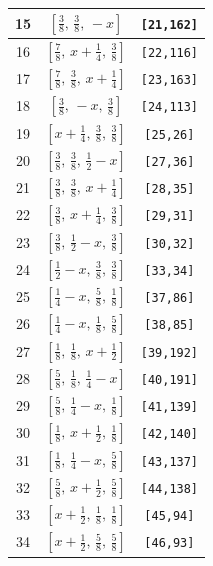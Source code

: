 \documentclass[fleqn,8pt]{jsarticle}
\begin{document}
\begin{longtable}{ccc}
15 & $\left[ \frac{3}{8},\, \frac{3}{8},\, - x \right]$ & {\tt [21,162]} \\ \hline
16 & $\left[ \frac{7}{8},\, x + \frac{1}{4},\, \frac{3}{8} \right]$ & {\tt [22,116]} \\ \hline
17 & $\left[ \frac{7}{8},\, \frac{3}{8},\, x + \frac{1}{4} \right]$ & {\tt [23,163]} \\ \hline
18 & $\left[ \frac{3}{8},\, - x,\, \frac{3}{8} \right]$ & {\tt [24,113]} \\ \hline
19 & $\left[ x + \frac{1}{4},\, \frac{3}{8},\, \frac{3}{8} \right]$ & {\tt [25,26]} \\ \hline
20 & $\left[ \frac{3}{8},\, \frac{3}{8},\, \frac{1}{2} - x \right]$ & {\tt [27,36]} \\ \hline
21 & $\left[ \frac{3}{8},\, \frac{3}{8},\, x + \frac{1}{4} \right]$ & {\tt [28,35]} \\ \hline
22 & $\left[ \frac{3}{8},\, x + \frac{1}{4},\, \frac{3}{8} \right]$ & {\tt [29,31]} \\ \hline
23 & $\left[ \frac{3}{8},\, \frac{1}{2} - x,\, \frac{3}{8} \right]$ & {\tt [30,32]} \\ \hline
24 & $\left[ \frac{1}{2} - x,\, \frac{3}{8},\, \frac{3}{8} \right]$ & {\tt [33,34]} \\ \hline
25 & $\left[ \frac{1}{4} - x,\, \frac{5}{8},\, \frac{1}{8} \right]$ & {\tt [37,86]} \\ \hline
26 & $\left[ \frac{1}{4} - x,\, \frac{1}{8},\, \frac{5}{8} \right]$ & {\tt [38,85]} \\ \hline
27 & $\left[ \frac{1}{8},\, \frac{1}{8},\, x + \frac{1}{2} \right]$ & {\tt [39,192]} \\ \hline
28 & $\left[ \frac{5}{8},\, \frac{1}{8},\, \frac{1}{4} - x \right]$ & {\tt [40,191]} \\ \hline
29 & $\left[ \frac{5}{8},\, \frac{1}{4} - x,\, \frac{1}{8} \right]$ & {\tt [41,139]} \\ \hline
30 & $\left[ \frac{1}{8},\, x + \frac{1}{2},\, \frac{1}{8} \right]$ & {\tt [42,140]} \\ \hline
31 & $\left[ \frac{1}{8},\, \frac{1}{4} - x,\, \frac{5}{8} \right]$ & {\tt [43,137]} \\ \hline
32 & $\left[ \frac{5}{8},\, x + \frac{1}{2},\, \frac{5}{8} \right]$ & {\tt [44,138]} \\ \hline
33 & $\left[ x + \frac{1}{2},\, \frac{1}{8},\, \frac{1}{8} \right]$ & {\tt [45,94]} \\ \hline
34 & $\left[ x + \frac{1}{2},\, \frac{5}{8},\, \frac{5}{8} \right]$ & {\tt [46,93]} \\ \hline

\end{longtable}
\end{document}
